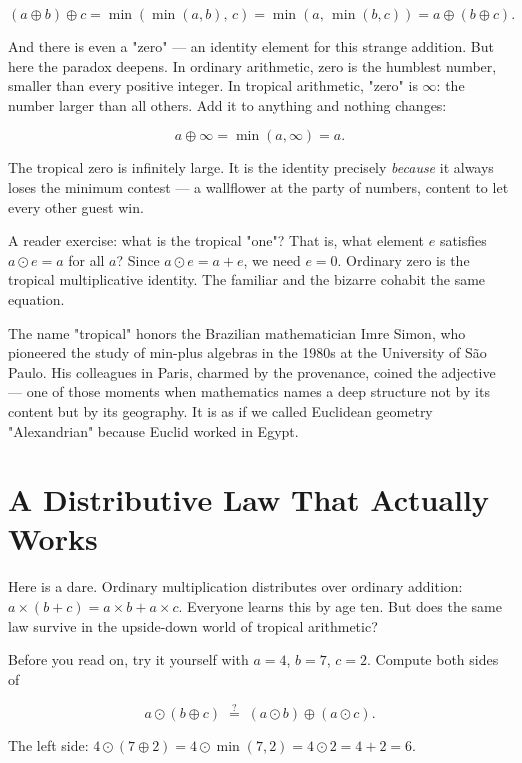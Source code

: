 \[
(a \oplus b) \oplus c = \min(\min(a,b),\, c) = \min(a,\, \min(b,c)) = a \oplus (b \oplus c).
\]

And there is even a "zero" --- an identity element for this strange addition. But here the paradox deepens. In ordinary arithmetic, zero is the humblest number, smaller than every positive integer. In tropical arithmetic, "zero" is $\infty$: the number larger than all others. Add it to anything and nothing changes:

\[
a \oplus \infty = \min(a, \infty) = a.
\]

The tropical zero is infinitely large. It is the identity precisely \textit{because} it always loses the minimum contest --- a wallflower at the party of numbers, content to let every other guest win.

A reader exercise: what is the tropical "one"? That is, what element $e$ satisfies $a \odot e = a$ for all $a$? Since $a \odot e = a + e$, we need $e = 0$. Ordinary zero is the tropical multiplicative identity. The familiar and the bizarre cohabit the same equation.

The name "tropical" honors the Brazilian mathematician Imre Simon, who pioneered the study of min-plus algebras in the 1980s at the University of São Paulo. His colleagues in Paris, charmed by the provenance, coined the adjective --- one of those moments when mathematics names a deep structure not by its content but by its geography. It is as if we called Euclidean geometry "Alexandrian" because Euclid worked in Egypt.


\ornbreak



\section{A Distributive Law That Actually Works}


Here is a dare. Ordinary multiplication distributes over ordinary addition: $a \times (b + c) = a \times b + a \times c$. Everyone learns this by age ten. But does the same law survive in the upside-down world of tropical arithmetic?

Before you read on, try it yourself with $a = 4$, $b = 7$, $c = 2$. Compute both sides of

\[
a \odot (b \oplus c) \;\stackrel{?}{=}\; (a \odot b) \oplus (a \odot c).
\]

The left side: $4 \odot (7 \oplus 2) = 4 \odot \min(7,2) = 4 \odot 2 = 4 + 2 = 6$.

